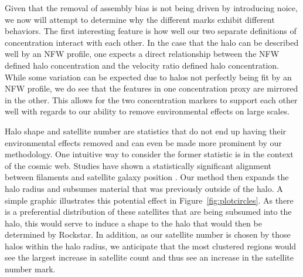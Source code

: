 \documentclass[usenatbib,usegraphicx,letterpaper]{mn2e}
\begin{document}
Given that the removal of assembly bias is not being driven by introducing noice, we now will attempt to determine why the different marks exhibit different behaviors. The first interesting feature is how well our two separate definitions of concentration interact with each other. In the case that the halo can be described well by an NFW profile, one expects a direct relationship between the NFW defined halo concentration and the velocity ratio defined halo concentration. While some variation can be expected due to halos not perfectly being fit by an NFW profile, we do see that the features in one concentration proxy are mirrored in the other. This allows for the two concentration markers to support each other well with regards to our ability to remove environmental effects on large scales.


Halo shape and satellite number are statistics that do not end up having their environmental effects removed and can even be made more prominent by our methodology. One intuitive way to consider the former statistic is in the context of the cosmic web. Studies have shown a statistically significant alignment between filaments and satellite galaxy position \citep{tempel15, velliscig15}. Our method then expands the halo radius and subsumes material that was previously outside of the halo. A simple graphic illustrates this potential effect in Figure~\ref{fig:plotcircles}. As there is a preferential distribution of these satellites that are being subsumed into the halo, this would serve to induce a shape to the halo that would then be determined by Rockstar. In addition, as our satellite number is chosen by those halos within the halo radius, we anticipate that the most clustered regions would see the largest increase in satellite count and thus see an increase in the satellite number mark.
\end{document}
